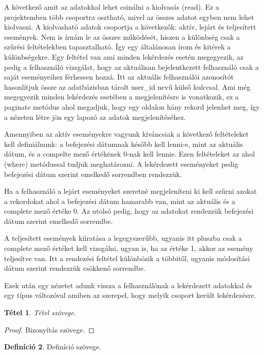 \documentclass[
]{thesis-ekf}
\newtheorem{tetel}{Tétel}[chapter]
\theoremstyle{definition}
\newtheorem{definicio}[tetel]{Definíció}
\theoremstyle{remark}
\begin{document}
A következő amit az adatokkal lehet csinálni a kiolvasás (read). Ez a projektemben több csoportra osztható, mivel az összes adatot egyben nem lehet kiolvasni. A kiolvasható adatok csoportja a következők: aktív, lejárt és teljesített események. Nem is írnám le az összes működését, hiszen a különbség csak a szűrési feltételekben tapasztalható. Így egy általánosan írom és kitérek a különbségekre. Egy feltétel van ami minden lekérdezés esetén megegyezik, az pedig a felhasználó vizsgálat, hogy az aktuálisan bejelentkezett felhasználó csak a saját eseményeihez férhessen hozzá. Itt az aktuális felhasználói azonosítót hasonlítjuk össze az adatbázisban tárolt user\_id nevű külső kulccsal. Ami még megegyezik minden lekérdezés esetében a megjelenítésre is vonatkozik, ez a paginate metódus ahol megadjuk, hogy egy oldalon hány rekord jelenhet meg, így a nézeten létre jön egy lapozó az adatok megjelenítéséhez.

Amennyiben az aktív eseményekre vagyunk kíváncsiak a következő feltételeket kell definiálnunk: a befejezési dátumnak később kell lenni-e, mint az aktuális dátum, és a compelte mező értékének 0-nak kell lennie. Ezen feltételeket az ahol (where) metódussal tudjuk meghatározni. A lekérdezett eseményeket pedig befejezési dátum szerint emelkedő sorrendben rendezzük.

Ha a felhasználó a lejárt eseményeket szeretné megjeleníteni ki kell szűrni azokat a rekordokat ahol a befejezési dátum hamarabb van, mint az aktuális és a complete mező értéke 0. Az utolsó pedig, hogy az adatokat rendezzük befejezési dátum szerint emelkedő sorrendbe.

A teljesített események kiíratása a legegyszerűbb, ugyanis itt pluszba csak a complete mező értéket kell vizsgálni, ugyan is, ha az értéke 1, akkor az esemény teljesítve van. Itt a rendezési feltétel különbözik a többitől, ugyanis módosítási dátum szerint rendezzük csökkenő sorrendbe.

Ezek után egy nézetet adunk vissza a felhasználónak a lekérdezett adatokkal és egy típus változóval amiben az szerepel, hogy melyik csoport került lekérdezésre.

\begin{tetel}
Tétel szövege.
\end{tetel}

\begin{proof}
Bizonyítás szövege.
\end{proof}

\begin{definicio}
Definíció szövege.
\end{definicio}
\end{document}
